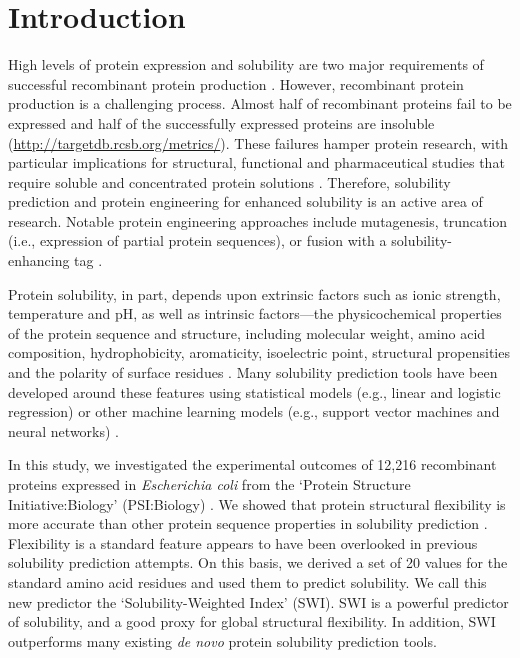 \section{Introduction}

High levels of protein expression and solubility are two major requirements of successful recombinant protein production \citep{Esposito2006-tj}. However, recombinant protein production is a challenging process. Almost half of recombinant proteins fail to be expressed and half of the successfully expressed proteins are insoluble (\href{http://targetdb.rcsb.org/metrics/}{http://targetdb.rcsb.org/metrics/}). These failures hamper protein research, with particular implications for structural, functional and pharmaceutical studies that require soluble and concentrated protein solutions \citep{Kramer2012-wk, Hou2018-yd}. Therefore, solubility prediction and protein engineering for enhanced solubility is an active area of research. Notable protein engineering approaches include mutagenesis, truncation (i.e., expression of partial protein sequences), or fusion with a solubility-enhancing tag \citep{Waldo2003-ui, Esposito2006-tj, Trevino2007-on, Chan2010-mo, Kramer2012-wk, Costa2014-oe}.

Protein solubility, in part, depends upon extrinsic factors such as ionic strength, temperature and pH, as well as intrinsic factors—the physicochemical properties of the protein sequence and structure, including molecular weight, amino acid composition, hydrophobicity, aromaticity, isoelectric point, structural propensities and the polarity of surface residues \citep{Wilkinson1991-zp, Chiti2003-zk, Tartaglia2004-wm, Diaz2010-md}. Many solubility prediction tools have been developed around these features using statistical models (e.g., linear and logistic regression) or other machine learning models (e.g., support vector machines and neural networks) \citep{Hirose2013-nq, Habibi2014-jq, Hebditch2017-bg, Sormanni2017-lo, Heckmann2018-wb, Wu2019-nz, Yang2019-kd}. 

In this study, we investigated the experimental outcomes of 12,216 recombinant proteins expressed in \textit{Escherichia coli} from the ‘Protein Structure Initiative:Biology’ (PSI:Biology) \citep{Chen2004-cp, Acton2005-ng}. We showed that protein structural flexibility is more accurate than other protein sequence properties in solubility prediction \citep{vihinen1994accuracy, Craveur2015-wg}. Flexibility is a standard feature appears to have been overlooked in previous solubility prediction attempts. On this basis, we derived a set of 20 values for the standard amino acid residues and used them to predict solubility. We call this new predictor the ‘Solubility-Weighted Index’ (SWI). SWI is a powerful predictor of solubility, and a good proxy for global structural flexibility. In addition, SWI outperforms many existing \textit{de novo} protein solubility prediction tools.

